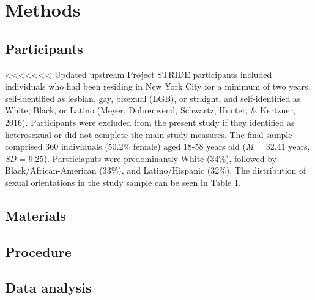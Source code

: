 \documentclass[
  english,
  man,floatsintext]{apa6}
\begin{document}
\hypertarget{methods}{%
\section{Methods}\label{methods}}

\hypertarget{participants}{%
\subsection{Participants}\label{participants}}

<<<<<<< Updated upstream
Project STRIDE participants included individuals who had been residing in New York City for a minimum of two years, self-identified as lesbian, gay, bisexual (LGB), or straight, and self-identified as White, Black, or Latino (Meyer, Dohrenwend, Schwartz, Hunter, \& Kertzner, 2016). Participants were excluded from the present study if they identified as heterosexual or did not complete the main study measures. The final sample comprised 360 individuals (50.2\% female) aged 18-58 years old (\emph{M} = 32.41 years, \emph{SD} = 9.25). Partticiapnts were predominantly White (34\%), followed by Black/African-American (33\%), and Latino/Hispanic (32\%). The distribution of sexual orientations in the study sample can be seen in Table 1.

\hypertarget{materials}{%
\subsection{Materials}\label{materials}}

\hypertarget{procedure}{%
\subsection{Procedure}\label{procedure}}

\hypertarget{data-analysis}{%
\subsection{Data analysis}\label{data-analysis}}
\end{document}
